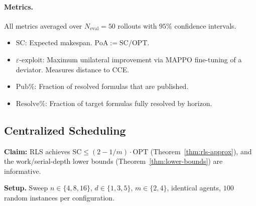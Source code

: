 \paragraph{Metrics.}
All metrics averaged over $N_{\mathrm{eval}} = 50$ rollouts with $95\%$ confidence intervals.
\begin{itemize}
    \item $\mathrm{SC}$: Expected makespan. \quad $\mathrm{PoA} := \mathrm{SC}/\mathrm{OPT}$.
    \item $\varepsilon\text{-exploit}$: Maximum unilateral improvement via MAPPO fine-tuning of a deviator. Measures distance to CCE.
    \item $\mathrm{Pub\%}$: Fraction of resolved formulas that are published.
    \item $\mathrm{Resolve\%}$: Fraction of target formulas fully resolved by horizon.
\end{itemize}
\subsection{Centralized Scheduling}\label{sec:exp-centralized}

\textbf{Claim:} RLS achieves $\mathrm{SC} \le (2-1/m)\cdot\mathrm{OPT}$ (Theorem~\ref{thm:rls-approx}), and the work/serial-depth lower bounds (Theorem~\ref{thm:lower-bounds}) are informative.

\textbf{Setup.} Sweep $n\in\{4,8,16\}$, $d\in\{1,3,5\}$, $m\in\{2,4\}$, identical agents, $100$ random instances per configuration.

